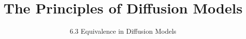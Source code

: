 
\title{The Principles of Diffusion Models}
\subtitle{6.3 Equivalence in Diffusion Models}


\begin{frame}
    \titlepage
\end{frame}


